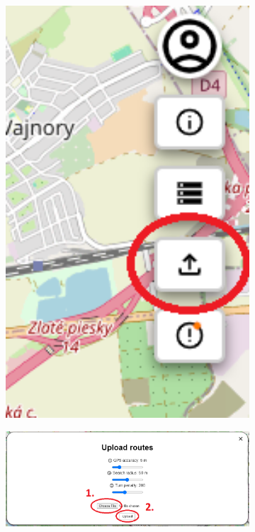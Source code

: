 \begin{figure}[H]
     \centering
     \begin{subfigure}{0.2\textwidth}
         \centering
         \includegraphics[width=1\textwidth]{guide_includes/img/upload_file_tool_button.png}
     \end{subfigure}
     \begin{subfigure}{0.78\textwidth}
         \centering
         \includegraphics[width=1\textwidth]{guide_includes/img/upload_file.png}
     \end{subfigure}
\end{figure}


